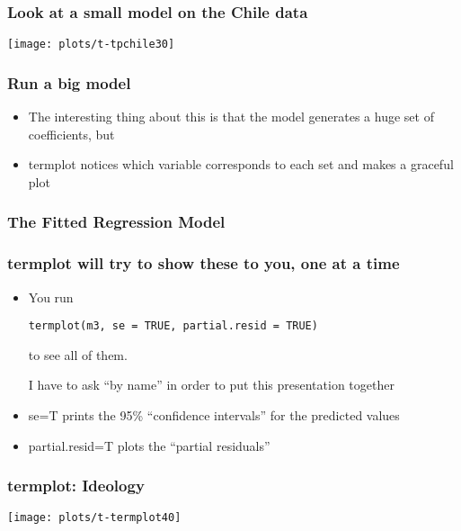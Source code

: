 \documentclass[10pt,english]{beamer}
\begin{document}
\begin{frame}
\frametitle{Look at a small model on the Chile data}


\texttt{[image: plots/t-tpchile30]}

\end{frame}

\begin{frame}
\frametitle{Run a big model}



\begin{itemize}
\item The interesting thing about this is that the model generates a huge
set of coefficients, but
\item termplot notices which variable corresponds to each set and makes
a graceful plot
\end{itemize}
\end{frame}

\begin{frame}
\frametitle{The Fitted Regression Model}

\scriptsize{

}

\end{frame}

\begin{frame}[containsverbatim]
\frametitle{termplot will try to show these to you, one at a time}
\begin{itemize}
\item You run 


\begin{lstlisting}
termplot(m3, se = TRUE, partial.resid = TRUE)
\end{lstlisting}


to see all of them. 


I have to ask ``by name'' in order to put this presentation together

\item se=T prints the 95\% ``confidence intervals'' for the predicted
values
\item partial.resid=T plots the ``partial residuals''
\end{itemize}
\end{frame}

\begin{frame}[containsverbatim]
\frametitle{termplot: Ideology}


\texttt{[image: plots/t-termplot40]}

\end{frame}
\end{document}
